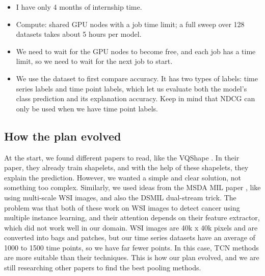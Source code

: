 \begin{itemize}\itemsep2pt
  \item {I have only 4 months of internship time.}
  \item {Compute: shared GPU nodes with a job time limit; a full sweep over 128
        datasets takes about 5 hours per model.}
  \item {We need to wait for the GPU nodes to become free, and each job has a time limit, so we need to wait for the next job to start.}
  \item {We use the \webtraffic{} dataset to first compare accuracy. It has two types of labels: time series labels and time point labels, which let us evaluate both the model's class prediction and its explanation accuracy. Keep in mind that NDCG can only be used when we have time point labels.}
  
  
\end{itemize}

\subsection{How the plan evolved}



{At the start, we found different papers to read, like the VQShape \citep{wen2024vqshape}. In their paper, they already train shapelets, and with the help of these shapelets, they explain the prediction. However, we wanted a simple and clear solution, not something too complex. Similarly, we used ideas from the MSDA MIL paper \citep{hashimoto2020msdamil}, like using multi-scale WSI images, and also the DSMIL \citep{li2021dsmil} dual-stream trick. The problem was that both of these work on WSI images to detect cancer using multiple instance learning, and their attention depends on their feature extractor, which did not work well in our domain. WSI images are 40k x 40k pixels and are converted into bags and patches, but our time series datasets have an average of 1000 to 1500 time points, so we have far fewer points. In this case, TCN methods are more suitable than their techniques. This is how our plan evolved, and we are still researching other papers to find the best pooling methods.}

